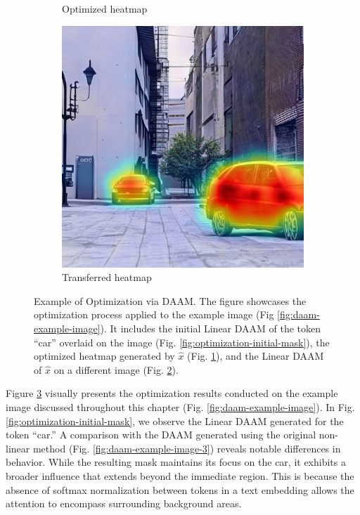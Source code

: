 \begin{figure}
\begin{subfigure}{0.30\columnwidth}
   \caption{Optimized heatmap}
   \label{fig:optimization-optimized-mask}
  \end{subfigure}
  \begin{subfigure}{0.30\columnwidth}
   \includegraphics[width=\columnwidth]{img/3-methodology/extrapolated_mask.png}
   \caption{Transferred heatmap}
   \label{fig:optimization-extrapolated-mask}
  \end{subfigure}
  \caption[Example of Optimization via DAAM]{Example of Optimization via DAAM. The figure showcases the optimization process applied to the example image (Fig \ref{fig:daam-example-image}). It includes the initial Linear DAAM of the token ``car'' overlaid on the image (Fig. \ref{fig:optimization-initial-mask}), the optimized heatmap generated by $\hat{x}$ (Fig. \ref{fig:optimization-optimized-mask}), and the Linear DAAM of $\hat{x}$ on a different image (Fig. \ref{fig:optimization-extrapolated-mask}).}
  \label{fig:example-optimization}
  \end{figure}


Figure \ref{fig:example-optimization} visually presents the optimization results conducted on the example image discussed throughout this chapter (Fig. \ref{fig:daam-example-image}). 
In Fig. \ref{fig:optimization-initial-mask}, we observe the Linear DAAM generated for the token ``car.'' A comparison with the DAAM generated using the original non-linear method (Fig. \ref{fig:daam-example-image-3}) reveals notable differences in behavior. While the resulting mask maintains its focus on the car, it exhibits a broader influence that extends beyond the immediate region. This is because the absence of softmax normalization between tokens in a text embedding allows the attention to encompass surrounding background areas.

